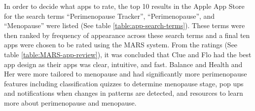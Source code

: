 In order to decide what apps to rate, the top 10 results in the Apple App Store for the search terms “Perimenopause Tracker”, “Perimenopause”, and “Menopause” were listed (See table \ref{table:app-search-terms}). These terms were then ranked by frequency of appearance across these search terms and a final ten apps were chosen to be rated using the MARS system. From the ratings (See table \ref{table:MARS-app-review}), it was concluded that Clue and Flo had the best app design as their apps was clear, intuitive, and fast. Balance and Health and Her were more tailored to menopause and had significantly more perimenopause features including classification quizzes to determine menopause stage, pop ups and notifications when changes in patterns are detected, and resources to learn more about perimenopause and menopause. 

